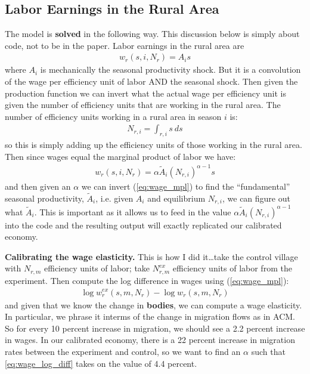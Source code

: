 \documentclass[pdftex,11pt]{article}
\begin{document}
\subsection{Labor Earnings in the Rural Area}

The model is \textbf{solved} in the following way. This discussion below is simply about code, not to be in the paper. Labor earnings in the rural area are
\begin{align}
w_{r}(s, i, N_r) = A_{i} s
\end{align}
where $A_i$ is mechanically the seasonal productivity shock. But it is a convolution of the wage per efficiency unit of labor AND the seasonal shock. Then given the production function we can invert what the actual wage per efficiency unit is given the number of efficiency units that are working in the rural area. The number of efficiency units working in a rural area in season $i$ is:
\begin{align}
N_{r,i} = \int_{r,i} s \ ds
\end{align}
so this is simply adding up the efficiency units of those working in the rural area. Then since wages equal the marginal product of labor we have:
\begin{align}
w_{r}(s, i, N_r) = \alpha \tilde{A}_{i} \left( N_{r,i} \right)^{\alpha - 1} s \label{eq:wage_mpl}
\end{align}
and then given an $\alpha$ we can invert (\ref{eq:wage_mpl}) to find the ``fundamental'' seasonal productivity, $\tilde{A}_{i}$, i.e. given $A_i$ and equilibrium $N_{r,i}$, we can figure out what $\tilde{A}_{i}$. This is important as it allows us to feed in the value $\alpha \tilde{A}_{i} \left( N_{r,i} \right)^{\alpha - 1}$ into the code and the resulting output will exactly replicated our calibrated economy.

\textbf{Calibrating the wage elasticity.} This is how I did it\ldots take the control village with $N_{r,m}$ efficiency units of labor; take $N^{ex}_{r,m}$ efficiency units of labor from the experiment. Then compute the log difference in wages using (\ref{eq:wage_mpl}):
\begin{align}
\log w^{ex}_{r}(s, m, N_r) - \log w_{r}(s, m, N_r) \label{eq:wage_log_diff}
\end{align}
and given that we know the change in \textbf{bodies}, we can compute a wage elasticity. In particular, we phrase it interms of the change in migration flows as in ACM. So for every 10 percent increase in migration, we should see a 2.2 percent increase in wages. In our calibrated economy, there is a 22 percent increase in migration rates between the experiment and control, so we want to find an $\alpha$ such that \ref{eq:wage_log_diff} takes on the value of 4.4 percent.
\end{document}
